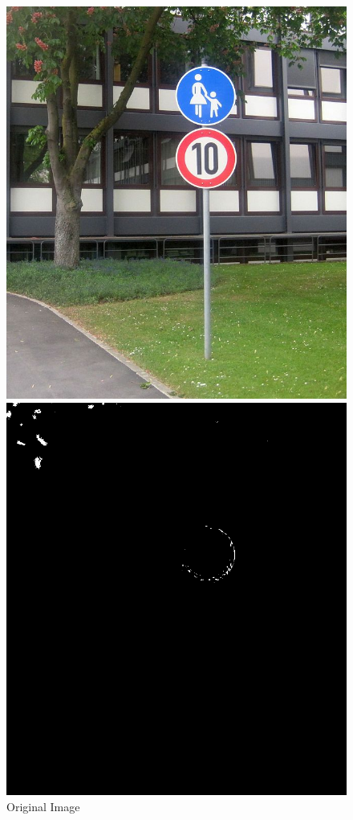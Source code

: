 \begin{figure}[H]
	\includegraphics[width=\linewidth]{images/101.jpg}
	\caption{Original Image}\label{fig:original_image}
	\endminipage\hfill
	\includegraphics[width=\linewidth]{images/lowerred.png}

\end{figure}

